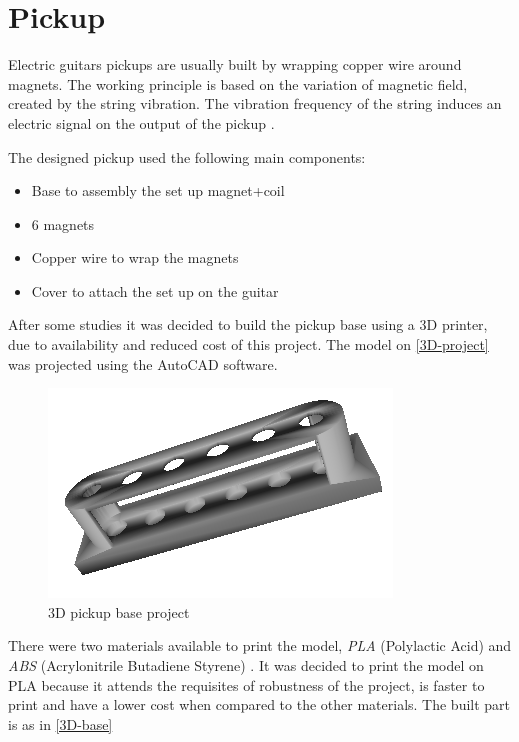 \section{Pickup}
\label{pickup}

Electric guitars pickups are usually built by wrapping copper wire around magnets.
The working principle is based on the variation of magnetic field, created by the string
vibration. The vibration frequency of the string induces an electric signal on the output of the pickup
\cite{pickup-work, faraday-law}.

The designed pickup used the following main components:

\begin{itemize}
  \item Base to assembly the set up magnet+coil
  \item 6 magnets
  \item Copper wire to wrap the magnets
  \item Cover to attach the set up on the guitar
\end{itemize}

After some studies it was decided to build the pickup base using a 3D printer, due to
availability and reduced cost of this project. The model on \autoref{3D-project}
was projected using the AutoCAD software.

\begin{figure}[!htpb]
\centering
\caption{3D pickup base project}
\label{3D-project}
\includegraphics[scale=0.5]{images/pickup}
\end{figure}

There were two materials available to print the model, \textit{PLA} (Polylactic Acid)
and \textit{ABS} (Acrylonitrile Butadiene Styrene) \cite{3d-materials}. It was decided to print
the model on PLA because it attends the requisites of robustness of the project, is
faster to print and have a lower cost when compared to the other materials. The built part is
as in \autoref{3D-base}

